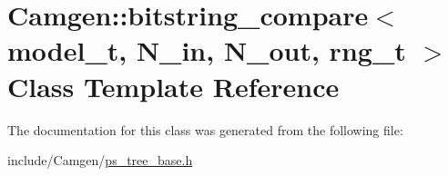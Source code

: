\hypertarget{a00024}{}\section{Camgen\+:\+:bitstring\+\_\+compare$<$ model\+\_\+t, N\+\_\+in, N\+\_\+out, rng\+\_\+t $>$ Class Template Reference}
\label{a00024}


The documentation for this class was generated from the following file\+:\begin{DoxyCompactItemize}
\item 
include/\+Camgen/\hyperlink{a00745}{ps\+\_\+tree\+\_\+base.\+h}\end{DoxyCompactItemize}
